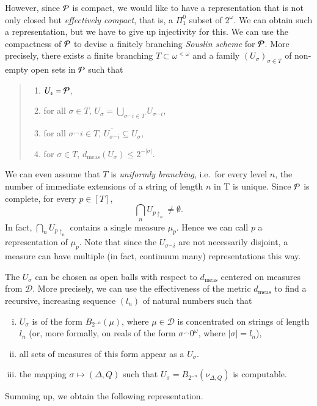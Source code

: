 \documentclass[11pt,reqno]{article}
\theoremstyle{plain}
\theoremstyle{definition}
\theoremstyle{remark}
\numberwithin{equation}{section}
\newcommand{\Cant}{\ensuremath{2^{\omega}}}
\newcommand{\Nstr}[1][<\omega]{\ensuremath{\omega^{#1}}}
\newcommand{\Rest}[1]{\ensuremath{\!\restriction_{#1}}}
\newcommand{\Conc}{\ensuremath{\mbox{}^\frown}}
\newcommand{\Estr}{\ensuremath{\epsilon}}
\newcommand{\Pmeas}{\ensuremath{\CMcal{P}}}
\DeclareMathOperator{\meas}{meas}
\begin{document}
However, since $\Pmeas$ is compact, we would like to have a representation that is not only closed but \emph{effectively compact}, that is, a $\Pi^0_1$ subset of $\Cant$. We can obtain such a representation, but we have to give up injectivity for this.
We can use the compactness of $\Pmeas$ to devise a finitely branching \emph{Souslin scheme} for $\Pmeas$. 
More precisely, there exists a finite branching $T \subset \Nstr$ and a family $(U_\sigma)_{\sigma \in T}$ of non-empty open sets in $\Pmeas$ such that 
\begin{quote}
	\begin{enumerate}[(1)]
	\item $U_\Estr = \Pmeas$,
	\item for all $\sigma \in T$, $U_{\sigma} = \bigcup_{\sigma\Conc i \in T} U_{\sigma\Conc i}$,
	\item for all $\sigma\Conc i \in T$, $\overline{U_{\sigma\Conc i}} \subseteq U_\sigma$,
	\item for $\sigma \in T$, $d_{\meas}(U_\sigma) \leq 2^{-|\sigma|}$.
	\end{enumerate}	
\end{quote}
We can even assume that $T$ is \emph{uniformly branching}, i.e.\ for every level $n$, the number of immediate extensions of a string of length $n$ in T is unique. 
Since $\Pmeas$ is complete, for every $p \in [T]$, 
\[
	\bigcap_n U_{p\Rest{n}} \neq \emptyset.	
\]
In fact, $\bigcap_n U_{p\Rest{n}}$ contains a single measure $\mu_p$. Hence we can call $p$ a representation of $\mu_p$. Note that since the $U_{\sigma \Conc i}$ are not necessarily disjoint, a measure can have multiple (in fact, continuum many) representations this way.

The $U_\sigma$ can be chosen as open balls with respect to $d_{\meas}$ centered on measures from $\mathcal{D}$. More precisely, we can use the effectiveness of the metric $d_{\meas}$ to find a recursive, increasing sequence $(l_n)$ of natural numbers such that 
\begin{enumerate}[(i)]
	\item $U_\sigma$ is of the form $B_{2^{-n}}(\mu)$, where $\mu\in \mathcal{D}$ is concentrated on strings of length $l_n$ (or, more formally, on reals of the form $\sigma\Conc 0^\omega$, where $|\sigma| = l_n$),
	\item all sets of measures of this form appear as a $U_\sigma$.
	\item the mapping $\sigma \mapsto (\Delta,Q)$ such that $U_\sigma = B_{2^{-n}}(\nu_{\Delta, Q})$ is computable.
\end{enumerate}
Summing up, we obtain the following representation.
\end{document}
